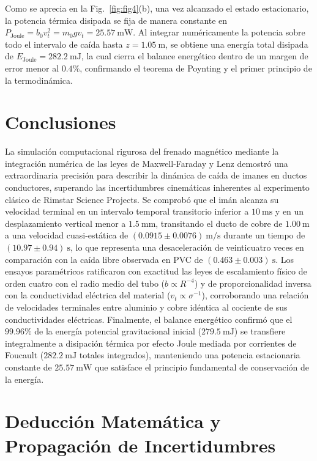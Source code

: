 \documentclass[aps,prb,reprint,twocolumn,superscriptaddress,amsmath,amssymb,floatfix]{revtex4-2}
\begin{document}
Como se aprecia en la Fig.~\ref{fig:fig4}(b), una vez alcanzado el estado estacionario, la potencia térmica disipada se fija de manera constante en $P_{\mathrm{Joule}} = b_0 v_t^2 = m_0 g v_t = 25.57\ \mathrm{mW}$. Al integrar numéricamente la potencia sobre todo el intervalo de caída hasta $z = 1.05\ \mathrm{m}$, se obtiene una energía total disipada de $E_{\mathrm{Joule}} = 282.2\ \mathrm{mJ}$, la cual cierra el balance energético dentro de un margen de error menor al $0.4\%$, confirmando el teorema de Poynting y el primer principio de la termodinámica.

\section{Conclusiones}
La simulación computacional rigurosa del frenado magnético mediante la integración numérica de las leyes de Maxwell-Faraday y Lenz demostró una extraordinaria precisión para describir la dinámica de caída de imanes en ductos conductores, superando las incertidumbres cinemáticas inherentes al experimento clásico de Rimstar Science Projects. Se comprobó que el imán alcanza su velocidad terminal en un intervalo temporal transitorio inferior a $10\ \mathrm{ms}$ y en un desplazamiento vertical menor a $1.5\ \mathrm{mm}$, transitando el ducto de cobre de $1.00\ \mathrm{m}$ a una velocidad cuasi-estática de $(0.0915 \pm 0.0076)\ \mathrm{m/s}$ durante un tiempo de $(10.97 \pm 0.94)\ \mathrm{s}$, lo que representa una desaceleración de veinticuatro veces en comparación con la caída libre observada en PVC de $(0.463 \pm 0.003)\ \mathrm{s}$. Los ensayos paramétricos ratificaron con exactitud las leyes de escalamiento físico de orden cuatro con el radio medio del tubo ($b \propto R^{-4}$) y de proporcionalidad inversa con la conductividad eléctrica del material ($v_t \propto \sigma^{-1}$), corroborando una relación de velocidades terminales entre aluminio y cobre idéntica al cociente de sus conductividades eléctricas. Finalmente, el balance energético confirmó que el $99.96\%$ de la energía potencial gravitacional inicial ($279.5\ \mathrm{mJ}$) se transfiere integralmente a disipación térmica por efecto Joule mediada por corrientes de Foucault ($282.2\ \mathrm{mJ}$ totales integrados), manteniendo una potencia estacionaria constante de $25.57\ \mathrm{mW}$ que satisface el principio fundamental de conservación de la energía.

\appendix
\section{Deducción Matemática y Propagación de Incertidumbres}
\end{document}
